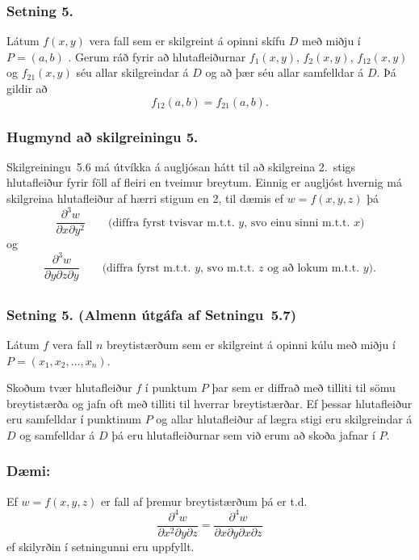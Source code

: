 \subsubsection{Setning 5.}
  Látum $f(x,y)$ vera fall sem er skilgreint á opinni
skífu $D$ með miðju í $P=(a,b)$ .  Gerum ráð fyrir að
hlutafleiðurnar $f_1(x,y)$, $f_2(x,y)$, $f_{12}(x,y)$ og $f_{21}(x,y)$
séu allar skilgreindar á $D$ og að þær séu allar samfelldar á $D$.  Þá
gildir að 
$$f_{12}(a,b)=f_{21}(a,b).$$
 


 \subsubsection{Hugmynd að skilgreiningu 5.}
  Skilgreiningu~5.6 má útvíkka á augljósan hátt
til að skilgreina 2.~stigs hlutafleiður fyrir föll af fleiri en
tveimur breytum.   Einnig er augljóst hvernig má skilgreina
hlutafleiður af hærri stigum en 2, til dæmis ef $w=f(x,y,z)$ þá 
$$\frac{\partial^3 w}{\partial x\partial y^2} \quad\quad\mbox{(diffra
    fyrst tvisvar m.t.t. }y\mbox{, svo einu sinni m.t.t. } x\mbox{)}$$
og 
$$\frac{\partial^3 w}{\partial y\partial z\partial y} \quad\quad\mbox{(diffra
    fyrst m.t.t. } y\mbox{, svo m.t.t. } z
\mbox{ og að lokum m.t.t. }y\mbox{)}.$$

 



\subsection{}
 \subsubsection{Setning 5. (Almenn útgáfa af Setningu~5.7)}
     Látum $f$ vera
fall $n$ breytistærðum sem er skilgreint á opinni kúlu með miðju í 
$P=(x_1, x_2,\ldots, x_n)$.  

\medskip
Skoðum tvær hlutafleiður $f$ í punktum $P$
þar sem er diffrað með tilliti til sömu breytistærða og jafn oft með
tilliti til hverrar breytistærðar.  Ef þessar hlutafleiður eru
samfelldar í punktinum $P$ og allar hlutafleiður af lægra stigi eru
skilgreindar á $D$ og samfelldar á $D$ þá eru hlutafleiðurnar sem við
erum að skoða jafnar í $P$.
 
\pause
 \subsubsection {Dæmi:} 
 Ef $w = f(x,y,z)$ er fall af þremur breytistærðum þá er t.d.~
 \begin {equation*}
  \frac{\partial^4 w}{\partial x^2\partial y \partial z} = \frac{\partial^4 w}{\partial x \partial y \partial x \partial z}
 \end {equation*}
ef skilyrðin í setningunni eru uppfyllt.
  
